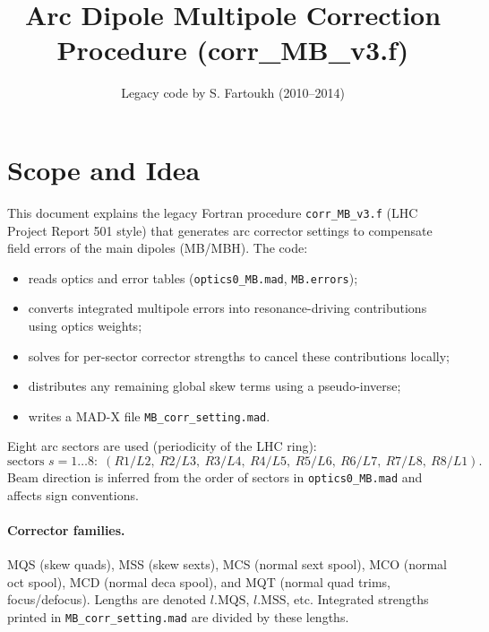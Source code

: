 \documentclass[11pt]{article}
\title{Arc Dipole Multipole Correction Procedure (corr\_MB\_v3.f)}
\author{Legacy code by S. Fartoukh (2010--2014)}
\date{}
\begin{document}
\maketitle

\section{Scope and Idea}
This document explains the legacy Fortran procedure \texttt{corr\_MB\_v3.f} (LHC Project Report 501 style) that generates arc corrector settings to compensate field errors of the main dipoles (MB/MBH). The code:
\begin{itemize}
  \item reads optics and error tables (\texttt{optics0\_MB.mad}, \texttt{MB.errors});
  \item converts integrated multipole errors into resonance-driving contributions using optics weights;
  \item solves for per-sector corrector strengths to cancel these contributions locally;
  \item distributes any remaining global skew terms using a pseudo-inverse;
  \item writes a MAD-X file \texttt{MB\_corr\_setting.mad}.
\end{itemize}
Eight arc sectors are used (periodicity of the LHC ring):
\[
\text{sectors } s=1\dots 8:\; (R1/L2,\ R2/L3,\ R3/L4,\ R4/L5,\ R5/L6,\ R6/L7,\ R7/L8,\ R8/L1).
\]
Beam direction is inferred from the order of sectors in \texttt{optics0\_MB.mad} and affects sign conventions.

\paragraph{Corrector families.} MQS (skew quads), MSS (skew sexts), MCS (normal sext spool), MCO (normal oct spool), MCD (normal deca spool), and MQT (normal quad trims, focus/defocus). Lengths are denoted $l.\mathrm{MQS}$, $l.\mathrm{MSS}$, etc. Integrated strengths printed in \texttt{MB\_corr\_setting.mad} are divided by these lengths.
\end{document}

